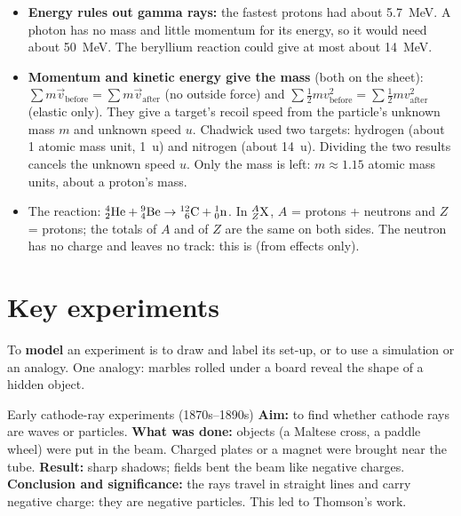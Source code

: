 \begin{itemize}
  \item \textbf{Energy rules out gamma rays:} the fastest protons had about \qty{5.7}{MeV}. A
        photon has no mass and little momentum for its energy, so it would need about
        \qty{50}{MeV}. The beryllium reaction could give at most about \qty{14}{MeV}.
  \item \textbf{Momentum and kinetic energy give the mass} (both on the sheet):
        $\sum m\vec{v}_\mathrm{before} = \sum m\vec{v}_\mathrm{after}$ (no outside force) and
        $\sum\frac{1}{2}mv^2_\mathrm{before} = \sum\frac{1}{2}mv^2_\mathrm{after}$ (elastic only).
        They give a target's recoil speed from the particle's unknown mass $m$ and unknown
        speed $u$. Chadwick used two targets: hydrogen (about 1 atomic mass unit, \qty{1}{u})
        and nitrogen (about \qty{14}{u}). Dividing the two results cancels the unknown speed
        $u$. Only the mass is left: $m \approx 1.15$ atomic mass units, about a proton's mass.
  \item The reaction: $\chTwoNuc{4}{2}{He} + \chTwoNuc{9}{4}{Be} \rightarrow \chTwoNuc{12}{6}{C}
        + \chTwoNuc{1}{0}{n}$. In $\chTwoNuc{A}{Z}{X}$, $A$ = protons + neutrons and $Z$ = protons;
        the totals of $A$ and of $Z$ are the same on both sides. The neutron
        has no charge and leaves no track: this is  (from effects only).
\end{itemize}


\section{Key experiments}\label{ch2:sec:experiments}

To \textbf{model} an experiment is to draw and label its set-up, or to use a simulation or an
analogy. One analogy: marbles rolled under a board reveal the shape of a hidden object.

\begin{experiment}[unbreakable]{Early cathode-ray experiments (1870s--1890s)}
\textbf{Aim:} to find whether cathode rays are waves or particles. \textbf{What was done:}
objects (a Maltese cross, a paddle wheel) were put in the beam. Charged plates or a magnet were
brought near the tube. \textbf{Result:} sharp shadows; fields bent the beam like negative
charges. \textbf{Conclusion and significance:} the rays travel in straight lines and carry
negative charge: they are negative particles. This led to Thomson's work.
\end{experiment}

